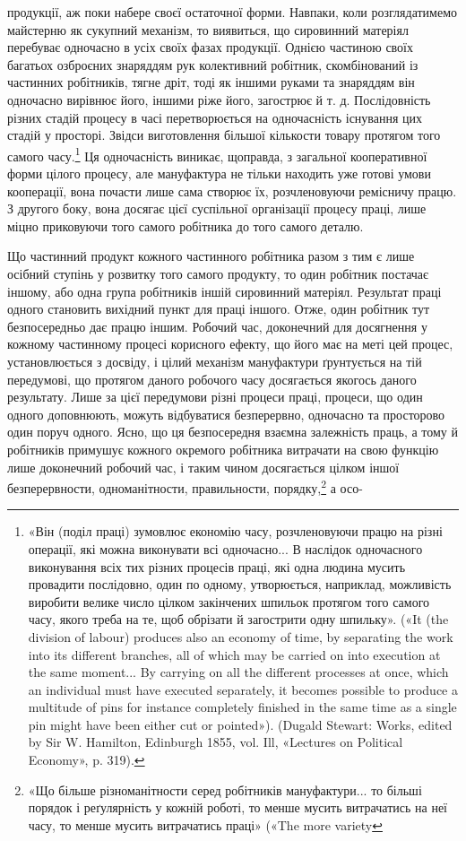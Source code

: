продукції, аж поки набере своєї остаточної форми. Навпаки, коли
розглядатимемо майстерню як сукупний механізм, то виявиться,
що сировинний матеріял перебуває одночасно в усіх своїх фазах
продукції. Однією частиною своїх багатьох озброєних знаряддям
рук колективний робітник, скомбінований із частинних робітників,
тягне дріт, тоді як іншими руками та знаряддям він одночасно
вирівнює його, іншими ріже його, загострює й т. д. Послідовність
різних стадій процесу в часі перетворюється на одночасність
існування цих стадій у просторі. Звідси виготовлення більшої
кількости товару протягом того самого часу.\footnote{
«Він (поділ праці) зумовлює економію часу, розчленовуючи
працю на різні операції, які можна виконувати всі одночасно... В наслідок
одночасного виконування всіх тих різних процесів праці, які одна
людина мусить провадити послідовно, один по одному, утворюється,
наприклад, можливість виробити велике число цілком закінчених
шпильок протягом того самого часу, якого треба на те, щоб обрізати й
загострити одну шпильку». («It (the division of labour) produces also
an economy of time, by separating the work into its different branches, all
of which may be carried on into execution at the same moment... By carrying
on all the different processes at once, which an individual must have
executed separately, it becomes possible to produce a multitude of pins
for instance completely finished in the same time as a single pin might
have been either cut or pointed»). (Dugald Stewart: Works, edited
by Sir W. Hamilton, Edinburgh 1855, vol. Ill, «Lectures on Political
Economy», p. 319).
} Ця одночасність
виникає, щоправда, з загальної кооперативної форми цілого
процесу, але мануфактура не тільки находить уже готові умови
кооперації, вона почасти лише сама створює їх, розчленовуючи
ремісничу працю. З другого боку, вона досягає цієї суспільної
організації процесу праці, лише міцно приковуючи того самого
робітника до того самого деталю.

Що частинний продукт кожного частинного робітника разом
з тим є лише осібний ступінь у розвитку того самого продукту,
то один робітник постачає іншому, або одна група робітників
іншій сировинний матеріял. Результат праці одного становить
вихідний пункт для праці іншого. Отже, один робітник тут безпосередньо
дає працю іншим. Робочий час, доконечний для
досягнення у кожному частинному процесі корисного ефекту,
що його має на меті цей процес, установлюється з досвіду, і цілий
механізм мануфактури ґрунтується на тій передумові, що протягом
даного робочого часу досягається якогось даного результату.
Лише за цієї передумови різні процеси праці, процеси, що
один одного доповнюють, можуть відбуватися безперервно,
одночасно та просторово один поруч одного. Ясно, що ця безпосередня
взаємна залежність праць, а тому й робітників примушує
кожного окремого робітника витрачати на свою функцію лише
доконечний робочий час, і таким чином досягається цілком іншої
безперервности, одноманітности, правильности, порядку,\footnote{
«Що більше різноманітности серед робітників мануфактури... то
більші порядок і реґулярність у кожній роботі, то менше мусить витрачатись
на неї часу, то менше мусить витрачатись праці» («The more variety
} а осо-